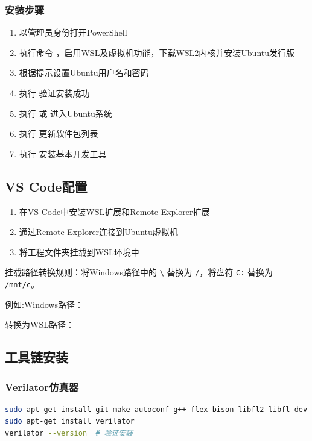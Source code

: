 \documentclass[12pt,a4paper]{article}
\begin{document}
\subsubsection{安装步骤}
\begin{enumerate}[itemsep=0pt, parsep=3pt]
    \item 以管理员身份打开PowerShell
    \item 执行命令 ，启用WSL及虚拟机功能，下载WSL2内核并安装Ubuntu发行版
    \item 根据提示设置Ubuntu用户名和密码
    \item 执行  验证安装成功
    \item 执行  或  进入Ubuntu系统
    \item 执行  更新软件包列表
    \item 执行  安装基本开发工具
\end{enumerate}

\subsection{VS Code配置}

\begin{enumerate}[itemsep=0pt, parsep=3pt]
    \item 在VS Code中安装WSL扩展和Remote Explorer扩展
    \item 通过Remote Explorer连接到Ubuntu虚拟机
    \item 将工程文件夹挂载到WSL环境中
\end{enumerate}

挂载路径转换规则：将Windows路径中的 \texttt{\textbackslash} 替换为 \texttt{/}，将盘符 \texttt{C:} 替换为 \texttt{/mnt/c}。

例如:Windows路径：

转换为WSL路径：

\subsection{工具链安装}

\subsubsection{Verilator仿真器}
\begin{lstlisting}[language=bash]
sudo apt-get install git make autoconf g++ flex bison libfl2 libfl-dev
sudo apt-get install verilator
verilator --version  # 验证安装
\end{lstlisting}
\end{document}
